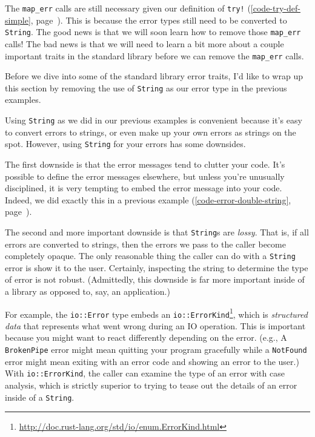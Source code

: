 \documentclass[a4paper,]{book}
\renewcommand*{\hyperref}[2][\ar]{%
  \def\ar{#2}%
  #2 (\autoref{#1}, page~\pageref{#1})}
\renewcommand{\href}[2]{#2\footnote{\url{#1}}}
\begin{document}
The \texttt{map\_err} calls are still necessary given
\hyperref[code-try-def-simple]{our definition of \texttt{try!}}. This is
because the error types still need to be converted to \texttt{String}.
The good news is that we will soon learn how to remove those
\texttt{map\_err} calls! The bad news is that we will need to learn a
bit more about a couple important traits in the standard library before
we can remove the \texttt{map\_err} calls.


Before we dive into some of the standard library error traits, I'd like
to wrap up this section by removing the use of \texttt{String} as our
error type in the previous examples.

Using \texttt{String} as we did in our previous examples is convenient
because it's easy to convert errors to strings, or even make up your own
errors as strings on the spot. However, using \texttt{String} for your
errors has some downsides.

The first downside is that the error messages tend to clutter your code.
It's possible to define the error messages elsewhere, but unless you're
unusually disciplined, it is very tempting to embed the error message
into your code. Indeed, we did exactly this in a
\hyperref[code-error-double-string]{previous example}.

The second and more important downside is that \texttt{String}s are
\emph{lossy}. That is, if all errors are converted to strings, then the
errors we pass to the caller become completely opaque. The only
reasonable thing the caller can do with a \texttt{String} error is show
it to the user. Certainly, inspecting the string to determine the type
of error is not robust. (Admittedly, this downside is far more important
inside of a library as opposed to, say, an application.)

For example, the \texttt{io::Error} type embeds an
\href{http://doc.rust-lang.org/std/io/enum.ErrorKind.html}{\texttt{io::ErrorKind}},
which is \emph{structured data} that represents what went wrong during
an IO operation. This is important because you might want to react
differently depending on the error. (e.g., A \texttt{BrokenPipe} error
might mean quitting your program gracefully while a \texttt{NotFound}
error might mean exiting with an error code and showing an error to the
user.) With \texttt{io::ErrorKind}, the caller can examine the type of
an error with case analysis, which is strictly superior to trying to
tease out the details of an error inside of a \texttt{String}.
\end{document}
